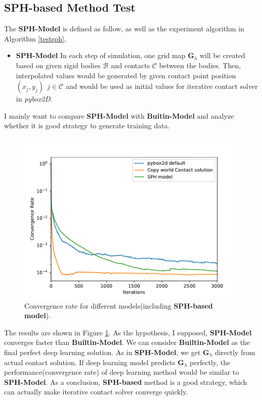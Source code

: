 \subsection{SPH-based Method Test}
    \label{sphtest}
    The \textbf{SPH-Model} is defined as follow, as well as the experiment algorithm in Algorithm \ref{testsph},
    \begin{itemize}
         \item \textbf{SPH-Model} In each step of simulation, one grid map $\pmb{G}_{\lambda}$ will be created based on given rigid bodies $\mathcal{B}$ and contacts $\mathcal{C}$ between the bodies. Then, interpolated values would be generated by given contact point position $(x_j, y_j)~~j \in \mathcal{C}$ and would be used as initial values for iterative contact solver in \textit{pybox2D}. 
    \end{itemize}
    I mainly want to compare \textbf{SPH-Model} with \textbf{Buitin-Model} and analyze whether it is good strategy to generate training data.
     \begin{figure}[!h]
        \centering
        \includegraphics[width=\textwidth]{Figures/addsph}
        \caption{Convergence rate for different models(including \textbf{SPH-based model}).}
        \label{fg:addsph}
    \end{figure}

    The results are shown in Figure \ref{fg:addsph}. As the hypothesis, I supposed, \textbf{SPH-Model} converges faster than \textbf{Builtin-Model}. We can consider \textbf{Builtin-Model} as the final perfect deep learning solution. As in \textbf{SPH-Model}, we get $\pmb{G}_{\lambda}$ directly from actual contact solution. If deep learning model predicts $\pmb{G}_{\lambda}$ perfectly, the performance(convergence rate) of deep learning method would be similar to \textbf{SPH-Model}. As a conclusion, \textbf{SPH-based} method is a good strategy, which can actually make iterative contact solver converge quickly.

